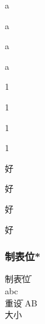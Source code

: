 \documentclass{ctexart}
\begin{document}
            a\par
            a\par
            {\setlength{\baselineskip}{4.838pt}
            a\par
            a\par
            }

            1\par
            1\par
            {\setlength{\baselineskip}{7.0193pt}
            1\par
            1\par
            }
            
            好\par
            好\par
            {\setlength{\baselineskip}{9.593pt}
            好\par
            好\par
            }

            
        \subsubsection{制表位*}
            \begin{tabbing}
                制\hspace{2em}\=表\hspace{4em}\=位\hspace{6em}\\
                a\>b\>c\\
                重\hspace{8em}\=设\hspace{2em}\kill
                A\>B\\
                大\>小\\
            \end{tabbing}
\end{document}
